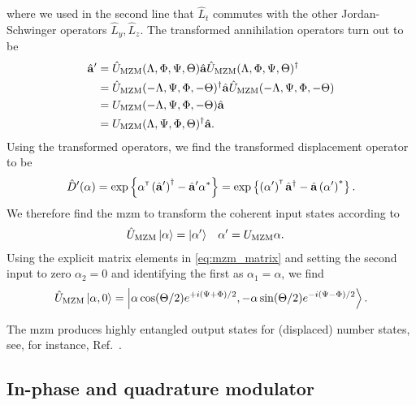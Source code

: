 where we used in the second line that $\hat{L}_t$ commutes with the other Jordan-Schwinger operators $\hat{L}_y,\hat{L}_z$.
The transformed annihilation operators turn out to be
\begin{equation}
	\begin{split}
		\hat{\vb{a}}^\prime
		&=
		\hat{U}_\text{MZM}(\Lambda,\Phi,\Psi,\Theta)
		\hat{\vb{a}}
		\hat{U}_\text{MZM}(\Lambda,\Phi,\Psi,\Theta)^\dagger
		\\
		&=
		\hat{U}_\text{MZM}(-\Lambda,\Psi,\Phi,-\Theta)^\dagger
		\hat{\vb{a}}
		\hat{U}_\text{MZM}(-\Lambda,\Psi,\Phi,-\Theta)
		\\
		&=
		U_\text{MZM}(-\Lambda,\Psi,\Phi,-\Theta)
		\hat{\vb{a}}
		\\
		&=
		U_\text{MZM}(\Lambda,\Psi,\Phi,\Theta)^\dagger
		\hat{\vb{a}}
		.
	\end{split}
\end{equation}
Using the transformed operators, we find the transformed displacement operator to be~\cite[p.~210]{Vogel2006}
\begin{equation}
	\hat{D}^\prime(\vb{\alpha})
	=
	\exp\left\{
		\vb{\alpha}^{\scriptscriptstyle\mathsf{T}}
		\left(\hat{\vb{a}}^\prime\right)^\dagger
		-
		\hat{\vb{a}}^\prime
		\vb{\alpha}^*
	\right\}
	=
	\exp\left\{
		\left(\vb{\alpha}^\prime\right)^{\scriptscriptstyle\mathsf{T}}
		\hat{\vb{a}}^\dagger
		-
		\hat{\vb{a}}
		\left(\vb{\alpha}^\prime\right)^*
	\right\}
	.
\end{equation}
We therefore find the \gls{mzm} to transform the coherent input states according to
\begin{align}
	\hat{U}_\text{MZM}
	\ket{\vb{\alpha}}
	&=
	\ket{\vb{\alpha}^\prime}
	&
	\vb{\alpha}^\prime
	&=
	U_\text{MZM}
	\vb{\alpha}
	.
\end{align}
Using the explicit matrix elements in \cref{eq:mzm_matrix} and setting the second input to zero $\alpha_2=0$ and identifying the first as $\alpha_1=\alpha$, we find
\begin{equation}
	\hat{U}_\text{MZM}
	\ket{\alpha,0}
	=
	\ket{\alpha\cos(\Theta/2)e^{+i(\Psi+\Phi)/2},-\alpha\sin(\Theta/2)e^{-i(\Psi-\Phi)/2}}
	.
\end{equation}

The \gls{mzm} produces highly entangled output states for (displaced) number states, see, for instance, Ref.~\cite{Windhager2011}.

\subsection{In-phase and quadrature modulator}

